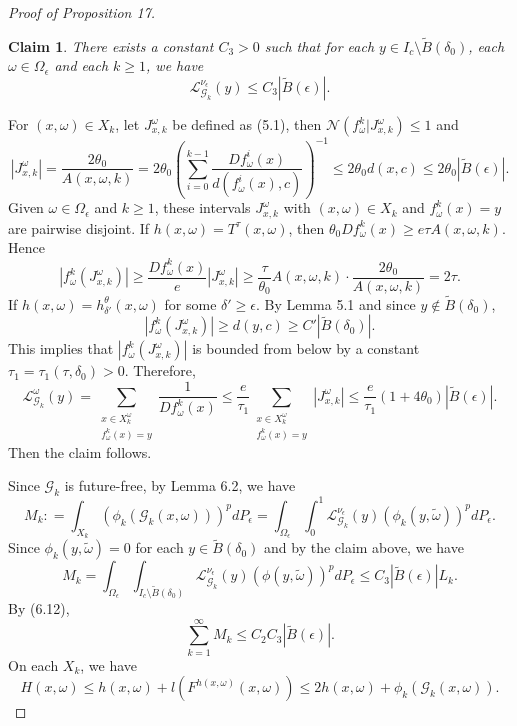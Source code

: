 \documentclass[11pt,oneside]{article}
\newtheorem*{claim}{Claim}
\theoremstyle{plain}
\numberwithin{equation}{section}
\numberwithin{figure}{section}
\numberwithin{table}{section}
\begin{document}
\begin{proof}[Proof of Proposition 17]
\begin{claim}
There exists a constant $C_3 > 0$ such that for each $y \in I_c \setminus \tilde B(\delta_0)$, each $\omega \in \Omega_{\epsilon}$ and each $k \geq 1$, we have
\[
\mathcal L_{\mathscr G_k}^{\nu_{\epsilon}} (y) \leq C_3 |\tilde B(\epsilon)|.
\]
\end{claim}


For $(x, \omega) \in X_k$, let $J_{x, k}^{\omega}$ be defined as (5.1), then $\mathcal N(f_{\omega}^k | J_{x, k}^{\omega} ) \leq 1$ and 
\[
|J_{x, k}^{\omega}| = \frac{2 \theta_0}{A(x, \omega, k)} = 2 \theta_0 \left( \sum_{i=0}^{k-1} \frac{Df_{\omega}^i(x)}{d(f_{\omega}^i(x), c)} \right)^{-1} \leq 2 \theta_0 d(x, c) \leq 2 \theta_0 |\tilde B(\epsilon)|.
\]
Given $\omega \in \Omega_{\epsilon}$ and $k \geq 1$, these intervals $J_{x, k}^{\omega}$ with $(x, \omega) \in X_k$ and $f_{\omega}^k(x) = y$ are pairwise disjoint. If $h(x, \omega) = T^{\tau}(x, \omega)$, then $\theta_0 Df_{\omega}^k(x) \geq e \tau A(x, \omega, k)$. Hence 
\[
|f_{\omega}^k (J_{x, k}^{\omega})| \geq \frac{Df_{\omega}^k(x)}{e} |J_{x, k}^{\omega}| \geq \frac{\tau}{\theta_0} A(x, \omega, k) \cdot  \frac{2 \theta_0}{A(x, \omega, k)} = 2 \tau.
\]
If $h(x, \omega) = h_{\delta'}^{\theta}(x, \omega)$ for some $\delta' \geq \epsilon$. By Lemma 5.1 and since $y \notin \tilde B(\delta_0)$,
\[
|f_{\omega}^k (J_{x, k}^{\omega})| \geq d(y, c) \geq C' |\tilde B(\delta_0)|.
\]
This implies that $|f_{\omega}^k (J_{x, k}^{\omega})|$ is bounded from below by a constant $\tau_1 = \tau_1(\tau, \delta_0) > 0$. Therefore,
\[
\mathcal L_{\mathscr G_k}^{\omega} (y) = \sum_{\substack{x \in X_k^{\omega} \\ f_{\omega}^k(x) =y}} \frac{1}{Df_{\omega}^k(x)} \leq \frac{e}{\tau_1}  \sum_{\substack{x \in X_k^{\omega} \\ f_{\omega}^k(x) =y}} |J_{x, k}^{\omega}| \leq \frac{e}{\tau_1}(1 + 4 \theta_0) |\tilde B(\epsilon)|.
\]
Then the claim follows. 


Since $\mathscr G_k$ is future-free, by Lemma 6.2, we have
\[
M_k : = \int_{X_k} (\phi_k(\mathscr G_k(x, \omega)))^p dP_{\epsilon} = \int_{\Omega_{\epsilon}} \int_0^1 \mathcal L_{\mathscr G_k}^{\nu_{\epsilon}} (y) (\phi_k(y, \tilde \omega))^p dP_{\epsilon}.
\]
Since $\phi_k(y, \tilde \omega) = 0$ for each $y \in \tilde B(\delta_0)$ and by the claim above, we have
\[
M_k = \int_{\Omega_{\epsilon}} \int_{I_c \setminus \tilde B(\delta_0)} \mathcal L_{\mathscr G_k}^{\nu_{\epsilon}} (y) (\phi(y, \tilde \omega))^p dP_{\epsilon} \leq C_3 |\tilde B(\epsilon)| L_k.
\]
By (6.12),
\begin{equation}
\sum_{k=1}^{\infty} M_k \leq C_2 C_3  |\tilde B(\epsilon)|.
\end{equation}
On each $X_k$, we have 
\[
H(x, \omega) \leq h(x, \omega) + l(F^{h(x, \omega)} (x, \omega)) \leq 2h(x, \omega) + \phi_k(\mathscr G_k(x, \omega)).
\]


\end{proof}
\end{document}
